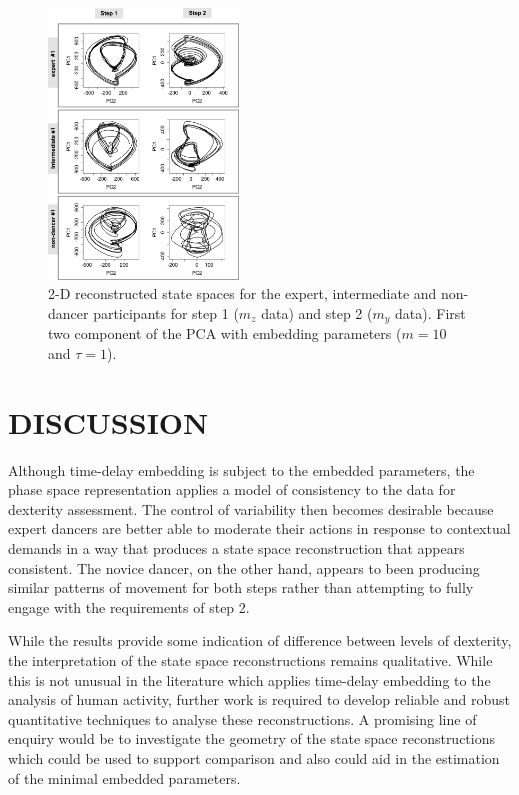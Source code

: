 \documentclass{sigchi}
\begin{document}
\begin{figure}[h!] 
  \centering    
  \includegraphics[width=0.45\textwidth]{skills}
  \caption[PA]{2-D reconstructed state spaces for the expert, intermediate and 
  non-dancer participants for step 1 ($m_z$ data) and step 2 ($m_y$ data). 
  First two component of the PCA with embedding parameters ($m = 10$ and $\tau = 1$).}
  \label{fig:skills}
  \end{figure}

\section{DISCUSSION}
Although time-delay embedding is subject to the embedded parameters, 
the phase space representation applies a model of consistency to the data for dexterity assessment. 
The control of variability then becomes desirable because expert dancers are better able to moderate 
their actions in response to contextual demands in a way that produces a state space reconstruction 
that appears consistent.  The novice dancer, on the other hand, appears to been producing similar 
patterns of movement for both steps rather than attempting to fully engage with the requirements of step 2.  


While the results provide some indication of difference between levels of dexterity, the interpretation of 
the state space reconstructions remains qualitative.  While this is not unusual in the literature
which applies time-delay embedding to the analysis of human activity, further work is required to develop 
reliable and robust quantitative techniques to analyse these reconstructions.  
A promising line of enquiry would be to investigate the geometry of the state space reconstructions
which could be used to support comparison \cite{Sama2013} and also could aid in the estimation of the minimal 
embedded parameters. 
 
\end{document}
